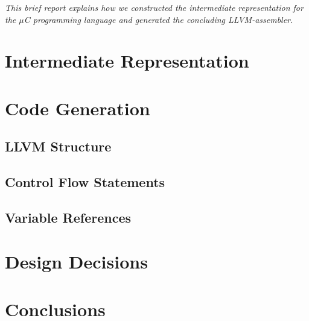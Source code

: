 \textit{This brief report explains how we constructed the intermediate representation for the $\mu$C programming language and generated the concluding LLVM-assembler.}

\section{Intermediate Representation}


\section{Code Generation}


\subsection{LLVM Structure}


\subsection{Control Flow Statements}


\subsection{Variable References}


\section{Design Decisions}

\section{Conclusions}
